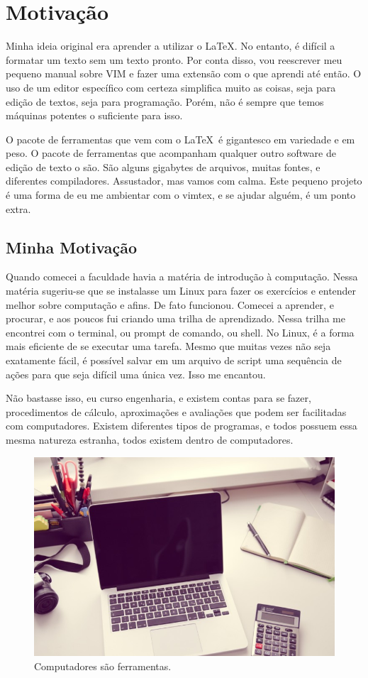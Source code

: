 \section{Motivação}
Minha ideia original era aprender a utilizar o \LaTeX.
No entanto, é difícil a formatar um texto sem um texto pronto.
Por conta disso, vou reescrever meu pequeno manual sobre VIM e fazer uma extensão com o que aprendi até então.
O uso de um editor específico com certeza simplifica muito as coisas, seja para edição de textos, seja para programação.
Porém, não é sempre que temos máquinas potentes o suficiente para isso.

O pacote de ferramentas que vem com o \LaTeX\ é gigantesco em variedade e em peso.
O pacote de ferramentas que acompanham qualquer outro software de edição de texto o são.
São alguns gigabytes de arquivos, muitas fontes, e diferentes compiladores.
Assustador, mas vamos com calma.
Este pequeno projeto é uma forma de eu me ambientar com o vimtex, e se ajudar alguém, é um ponto extra.

\subsection{Minha Motivação}
Quando comecei a faculdade havia a matéria de introdução à computação.
Nessa matéria sugeriu-se que se instalasse um Linux para fazer os exercícios e entender melhor sobre computação e afins.
De fato funcionou.
Comecei a aprender, e procurar, e aos poucos fui criando uma trilha de aprendizado.
Nessa trilha me encontrei com o terminal, ou prompt de comando, ou shell.
No Linux, é a forma mais eficiente de se executar uma tarefa.
Mesmo que muitas vezes não seja exatamente fácil, é possível salvar em um arquivo de script uma sequência de ações para que seja difícil uma única vez.
Isso me encantou.

Não bastasse isso, eu curso engenharia, e existem contas para se fazer,
procedimentos de cálculo, aproximações e avaliações que podem ser facilitadas com computadores.
Existem diferentes tipos de programas, e todos possuem essa mesma natureza estranha, todos existem dentro de computadores.

\begin{figure}[!h]
\centering
\includegraphics[scale=0.05]{motivacao/laptop-desk-notebook-computer.jpg}
\caption{Computadores são ferramentas.}
\end{figure}

